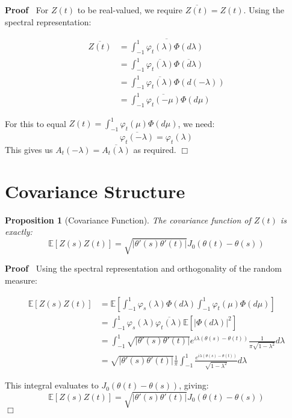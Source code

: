 \documentclass{article}
\newenvironment{proof}{\noindent\textbf{Proof\ }}{\hspace*{\fill}$\Box$\medskip}
\newtheorem{proposition}{Proposition}
{\theorembodyfont{\rmfamily}\newtheorem{remark}{Remark}}
\begin{document}
\begin{proof}
  For $Z (t)$ to be real-valued, we require $\overline{Z (t)} = Z (t)$. Using
  the spectral representation:
  
  \begin{align}
    \overline{Z (t)} & = \overline{\int_{- 1}^1 \varphi_t (\lambda) \Phi (d
    \lambda)} \\
    & = \int_{- 1}^1 \overline{\varphi_t (\lambda)} \overline{\Phi (d
    \lambda)} \\
    & = \int_{- 1}^1 \overline{\varphi_t (\lambda)} \Phi (d (- \lambda)) \\
    & = \int_{- 1}^1 \overline{\varphi_t  (- \mu)} \Phi (d \mu) 
  \end{align}
  
  For this to equal $Z (t) = \int_{- 1}^1 \varphi_t (\mu) \Phi (d \mu)$, we
  need:
  \begin{equation}
    \overline{\varphi_t  (- \lambda)} = \varphi_t (\lambda)
  \end{equation}
  This gives us $A_t  (- \lambda) = \overline{A_t (\lambda)}$ as required.
\end{proof}

\section{Covariance Structure}

\begin{proposition}
  [Covariance Function] The covariance function of $Z (t)$ is exactly:
  \begin{equation}
    \mathbb{E} [Z (s) Z (t)] = \sqrt{| \theta' (s) \theta' (t) |} J_0  (\theta
    (t) - \theta (s))
  \end{equation}
\end{proposition}

\begin{proof}
  Using the spectral representation and orthogonality of the random measure:
  
  \begin{align}
    \mathbb{E} [Z (s) Z (t)] & =\mathbb{E} \left[ \int_{- 1}^1 \varphi_s
    (\lambda) \Phi (d \lambda) \int_{- 1}^1 \varphi_t (\mu) \Phi (d \mu)
    \right] \\
    & = \int_{- 1}^1 \varphi_s (\lambda) \overline{\varphi_t (\lambda)}
    \mathbb{E} [| \Phi (d \lambda) |^2] \\
    & = \int_{- 1}^1 \sqrt{| \theta' (s) \theta' (t) |} e^{i \lambda (\theta
    (s) - \theta (t))}  \frac{1}{\pi \sqrt{1 - \lambda^2}} d \lambda \\
    & = \sqrt{| \theta' (s) \theta' (t) |}  \frac{1}{\pi}  \int_{- 1}^1
    \frac{e^{i \lambda (\theta (s) - \theta (t))}}{\sqrt{1 - \lambda^2}} d
    \lambda 
  \end{align}
  
  This integral evaluates to $J_0  (\theta (t) - \theta (s))$, giving:
  \begin{equation}
    \mathbb{E} [Z (s) Z (t)] = \sqrt{| \theta' (s) \theta' (t) |} J_0  (\theta
    (t) - \theta (s))
  \end{equation}
\end{proof}
\end{document}
